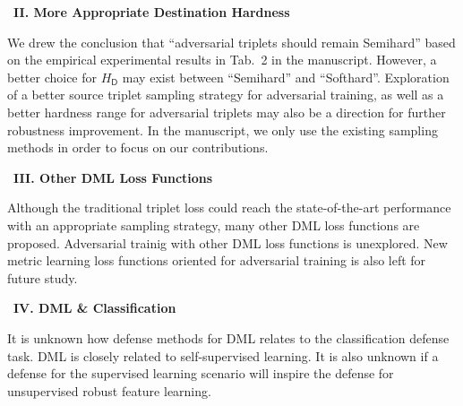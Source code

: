 ~\newline\textbf{II. More Appropriate Destination Hardness}

We drew the conclusion that ``adversarial triplets should remain Semihard''
based on the empirical experimental results in Tab.~2 in the manuscript.
%
However, a better choice for $H_\mathsf{D}$ may exist between ``Semihard''
and ``Softhard''.
%
Exploration of a better source triplet sampling strategy for adversarial
training, as well as a better hardness range for adversarial triplets
may also be a direction for further robustness improvement.
%
In the manuscript, we only use the existing sampling methods in order to focus
on our contributions.

~\newline\textbf{III. Other DML Loss Functions}

Although the traditional triplet loss could reach the state-of-the-art
performance with an appropriate sampling strategy, many other DML loss
functions are proposed.
%
Adversarial trainig with other DML loss functions is unexplored.
%
New metric learning loss functions oriented for adversarial training is
also left for future study.


~\newline\textbf{IV. DML \& Classification}

It is unknown how defense methods for DML relates to the classification defense
task.
%
DML is closely related to self-supervised learning.
%
It is also unknown if a defense for the supervised learning scenario will
inspire the defense for unsupervised robust feature learning.

\begin{comment}
	
 [T] By incorporating the idea of
	on-manifold adversarial example to adversarial training, the
	performance on benign example is greatly improved.
	That idea can be interpreted as to be selective on the adversarial
	example used for trianing.
	Here, in our observation, we are also selective on the adversarial
	examples used for training.
	Is there anything in common?

\end{comment}
